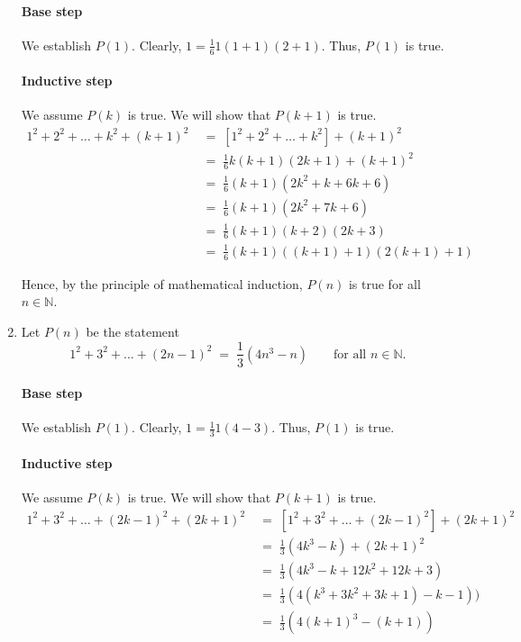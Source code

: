 \documentclass[10pt]{article}
\begin{document}
\begin{enumerate}
                \paragraph{Base step}
                We establish $P(1)$. Clearly, $1 = \frac{1}{6}1(1 + 1)(2 + 1)$. Thus, $P(1)$ is true.
                \paragraph{Inductive step}
                We assume $P(k)$ is true. We will show that $P(k + 1)$ is true.
                \begin{align*}
                        1^2 + 2^2 + \dots + k^2 + (k + 1)^2
                                \;&=\; [1^2 + 2^2 + \dots + k^2] + (k + 1)^2 \\
                                \;&=\; \frac{1}{6}k(k + 1)(2k + 1) + (k + 1)^2 \tag{From $P(k)$}\\
                                \;&=\; \frac{1}{6}(k + 1)(2k^2 + k + 6k + 6) \\
                                \;&=\; \frac{1}{6}(k + 1)(2k^2 + 7k + 6) \\
                                \;&=\; \frac{1}{6}(k + 1)(k + 2)(2k + 3) \\
                                \;&=\; \frac{1}{6}(k + 1)((k + 1) + 1)(2(k + 1) + 1)
                \end{align*}

                Hence, by the principle of mathematical induction, $P(n)$ is true for all $n \in \mathbb{N}$.
                
                \item Let $P(n)$ be the statement
                \[1^2 + 3^2 + \dots + (2n - 1)^2 \;=\; \frac{1}{3}(4n^3 - n) \quad\quad\text{for all }n \in \mathbb{N}.\]
                \paragraph{Base step}
                We establish $P(1)$. Clearly, $1 = \frac{1}{3}1(4 - 3)$. Thus, $P(1)$ is true.
                \paragraph{Inductive step}
                We assume $P(k)$ is true. We will show that $P(k + 1)$ is true.
                \begin{align*}
                        1^2 + 3^2 + \dots + (2k - 1)^2 + (2k + 1)^2
                                \;&=\; [1^2 + 3^2 + \dots + (2k - 1)^2] + (2k + 1)^2 \\
                                \;&=\; \frac{1}{3}(4k^3 - k) + (2k + 1)^2 \tag{From $P(k)$}\\
                                \;&=\; \frac{1}{3}(4k^3 - k + 12k^2 + 12k + 3)\\
                                \;&=\; \frac{1}{3}(4(k^3 + 3k^2 + 3k + 1) - k - 1)) \\
                                \;&=\; \frac{1}{3}(4(k + 1)^3 - (k + 1))
                \end{align*}


\end{enumerate}
\end{document}
